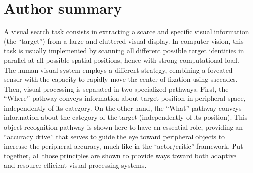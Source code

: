 \documentclass[10pt,a4paper]{article}
\begin{document}
\section*{Author summary}
A visual search task consists in extracting a scarce and specific visual information (the ``target'') from a large and cluttered visual display. In computer vision, this task is usually implemented by scanning all different possible target identities in parallel at all possible spatial positions, hence with strong computational load. The human visual system employs a different strategy, combining a foveated sensor with the capacity to rapidly move the center of fixation using saccades. Then, visual processing is separated in two specialized pathways. First, the ``Where'' pathway conveys information about target position in peripheral space, independently of its category. On the other hand, the ``What'' pathway conveys information about the category of the target (independently of its position). This object recognition pathway is shown here to have an essential role, providing an ``accuracy drive'' that serves to guide the eye toward peripheral objects to increase the peripheral accuracy, much like in the ``actor/critic'' framework. Put together, all those principles are shown to provide ways toward both adaptive and resource-efficient visual processing systems.










\nolinenumbers



\end{document}

